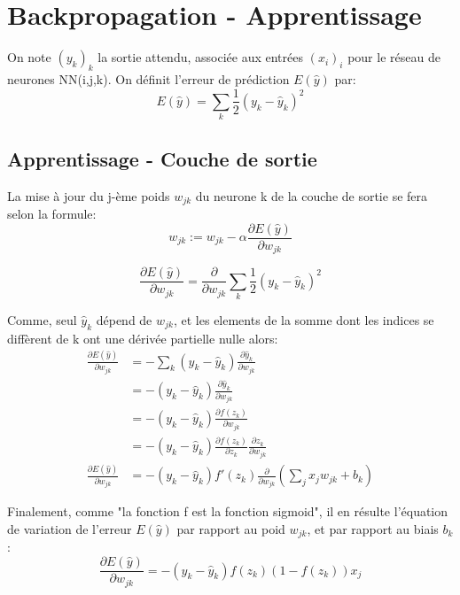 \documentclass{article}
\begin{document}
\section{Backpropagation - Apprentissage}

On note $(y_k)_k$ la sortie attendu, associée aux entrées $(x_i)_i$ pour le réseau de neurones NN(i,j,k). On définit l'erreur de prédiction $E(\hat{y})$ par:
\begin{equation}
E(\hat{y})=\sum_k{\frac{1}{2}(y_k-\hat{y}_k)^2}
\end{equation}

\newpage

\subsection{Apprentissage - Couche de sortie}

La mise à jour du j-ème poids $w_{jk}$ du neurone k de la couche de sortie se fera selon la formule: 
\begin{equation}
w_{jk}:=w_{jk}-\alpha\frac{\partial{E(\hat{y})}}{\partial{w_{jk}}}
\end{equation}

\begin{equation}
\frac{\partial{E(\hat{y})}}{\partial{w_{jk}}}=\frac{\partial{}}{\partial{w_{jk}}}\sum_k{\frac{1}{2}(y_k-\hat{y}_k)^2}
\end{equation}

Comme, seul $\hat{y}_k$ dépend de $w_{jk}$, et les elements de la somme dont les indices se diffèrent de k ont une dérivée partielle nulle alors:
\begin{equation}
\begin{split}
\frac{\partial{E(\hat{y})}}{\partial{w_{jk}}}&=-\sum_k{(y_k-\hat{y}_k)\frac{\partial{\hat{y}_k}}{\partial{w_{jk}}}}\\
&=-(y_k-\hat{y}_k)\frac{\partial{\hat{y}_k}}{\partial{w_{jk}}}\\
&=-(y_k-\hat{y}_k)\frac{\partial{f(z_k)}}{\partial{w_{jk}}}\\
&=-(y_k-\hat{y}_k)\frac{\partial{f(z_k)}}{\partial{z_k}}\frac{\partial{z_k}}{\partial{w_{jk}}}\\
\frac{\partial{E(\hat{y})}}{\partial{w_{jk}}}
&=-(y_k-\hat{y}_k){f'(z_k)}\frac{\partial{}}{\partial{w_{jk}}}(\sum_j{{x_j}w_{jk}}+b_k)
\end{split}
\end{equation}

Finalement, comme "la fonction f est la fonction sigmoid", il en résulte l'équation de variation de l'erreur $E(\hat{y})$ par rapport au poid $w_{jk}$, et par rapport au biais $b_k$:
$$\frac{\partial{E(\hat{y})}}{\partial{w_{jk}}}=-(y_k-\hat{y}_k)f(z_k)(1-f(z_k))x_j$$
\end{document}
